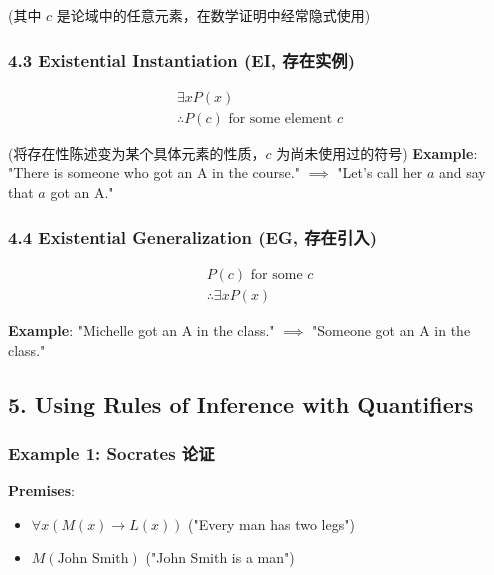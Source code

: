 \documentclass[10pt,a4paper,openany]{ctexbook}
\theoremstyle{definition}
\theoremstyle{remark}
\begin{document}
(其中 $c$ 是论域中的任意元素，在数学证明中经常隐式使用)
\vspace{-2pt}

\subsubsection{4.3 Existential Instantiation (EI, 存在实例)}

\[
\begin{array}{c}
\exists x P(x) \\
\hline
\therefore P(c) \text{ for some element } c
\end{array}
\]

(将存在性陈述变为某个具体元素的性质，$c$ 为尚未使用过的符号)
\textbf{Example}: "There is someone who got an A in the course." $\implies$ "Let's call her $a$ and say that $a$ got an A."
\vspace{-2pt}

\subsubsection{4.4 Existential Generalization (EG, 存在引入)}

\[
\begin{array}{c}
P(c) \text{ for some } c \\
\hline
\therefore \exists x P(x)
\end{array}
\]

\textbf{Example}: "Michelle got an A in the class." $\implies$ "Someone got an A in the class."
\vspace{-2pt}

\subsection{5. Using Rules of Inference with Quantifiers}

\subsubsection{Example 1: Socrates 论证}

\textbf{Premises}:
\begin{itemize}
\item $\forall x (M(x) \to L(x))$ ("Every man has two legs")
\item $M(\text{John Smith})$ ("John Smith is a man")

\end{itemize}
\end{document}
